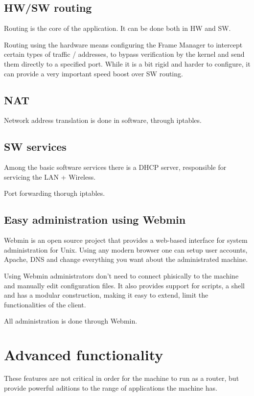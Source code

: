 \subsection{HW/SW routing}
\label{sub-sec:routing}
Routing is the core of the application. It can be done both in HW and SW.

Routing using the hardware means configuring the Frame Manager to intercept
certain types of traffic / addresses, to bypass verification by the kernel 
and send them directly to a specified port. While it is a bit rigid and
harder to configure, it can provide a very important speed boost over SW
routing.


\subsection{NAT}
\label{sub-sec:nat}
Network address translation is done in software, through iptables.

\subsection{SW services}
\label{sub-sec:sw-services}
Among the basic software services there is a DHCP server, responsible 
for servicing the LAN + Wireless.

Port forwarding thorugh iptables.


\subsection{Easy administration using Webmin}
\label{sub-sec:webmin}
Webmin is an open source project that provides a web-based interface for
system administration for Unix. Using any modern browser one can setup
user accounts, Apache, DNS and change everything you want about the
administrated machine. 

Using Webmin administrators don't need to connect phisically to the machine
and manually edit configuration files. It also provides support for scripts,
a shell and has a modular construction, making it easy to extend, limit
the functionalities of the client.

All administration is done through Webmin.

\section{Advanced functionality}
These features are not critical in order for the machine to run as a router,
but provide powerful aditions to the range of applications the machine has.


